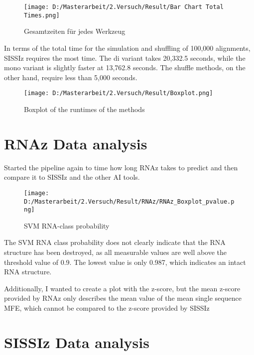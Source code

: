 \documentclass{article}
\begin{document}
\begin{large}
\begin{figure}[H]
    \centering
    \texttt{[image: D:/Masterarbeit/2.Versuch/Result/Bar Chart Total Times.png]}
    \caption{Gesamtzeiten für jedes Werkzeug}
    \label{fig:bar_chart_total}
\end{figure}


In terms of the total time for the simulation and shuffling of 100,000 alignments, SISSIz requires the most time. The di variant takes 20,332.5 seconds, while the mono variant is slightly faster at 13,762.8 seconds. The shuffle methods, on the other hand, require less than 5,000 seconds.


\begin{figure}[H]
    \centering
    \texttt{[image: D:/Masterarbeit/2.Versuch/Result/Boxplot.png]}
    \caption{Boxplot of the runtimes of the methods}
    \label{fig:boxplot_randomisation}
\end{figure}

\clearpage

\section{RNAz Data analysis}

Started the pipeline again to time how long RNAz takes to predict and then compare it to SISSIz and the other AI tools.

\begin{figure}[H]
    \centering
    \texttt{[image: D:/Masterarbeit/2.Versuch/Result/RNAz/RNAz\_Boxplot\_pvalue.png]}
    \caption{SVM RNA-class probability}
    \label{fig:boxplot_svm}
\end{figure}


The SVM RNA class probability does not clearly indicate that the RNA structure has been destroyed, as all measurable values are well above the threshold value of 0.9. The lowest value is only 0.987, which indicates an intact RNA structure.

Additionally, I wanted to create a plot with the z-score, but the mean z-score provided by RNAz only describes the mean value of the mean single sequence MFE, which cannot be compared to the z-score provided by SISSIz

\clearpage

\section{SISSIz Data analysis}


\end{large}
\end{document}
